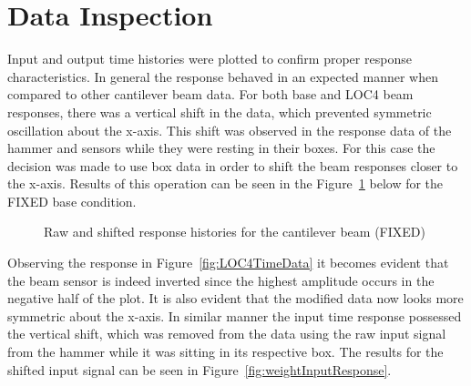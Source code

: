 \documentclass[paper=a4, fontsize=12pt]{scrartcl} %
\begin{document}
\section*{Data Inspection}
Input and output time histories were plotted to confirm proper response characteristics. In general the response behaved in an expected manner when compared to other cantilever beam data. For both base and LOC4 beam responses, there was a vertical shift in the data, which prevented symmetric oscillation about the x-axis. This shift was observed in the response data of the hammer and sensors while they were resting in their boxes. For this case the decision was made to use box data in order to shift the beam responses closer to the x-axis. Results of this operation can be seen in the Figure~\ref{fig:weightTimeResponse} below for the FIXED base condition.
%
	\begin{figure}[H]
		\centering
		\quad
		\caption{Raw and shifted response histories for the cantilever beam (FIXED)}
		\label{fig:weightTimeResponse}
	\end{figure}
%
Observing the response in Figure~\ref{fig:LOC4TimeData} it becomes evident that the beam sensor is indeed inverted since the highest amplitude occurs in the negative half of the plot. It is also evident that the modified data now looks more symmetric about the x-axis. In similar manner the input time response possessed the vertical shift, which was removed from the data using the raw input signal from the hammer while it was sitting in its respective box. The results for the shifted input signal can be seen in Figure~\ref{fig:weightInputResponse}.
\end{document}
